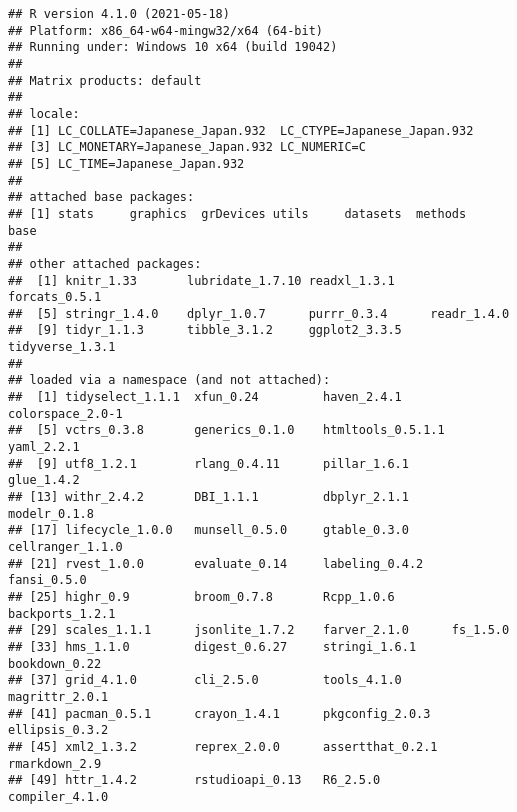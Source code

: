\documentclass[
]{book}
\begin{document}
\begin{verbatim}
## R version 4.1.0 (2021-05-18)
## Platform: x86_64-w64-mingw32/x64 (64-bit)
## Running under: Windows 10 x64 (build 19042)
## 
## Matrix products: default
## 
## locale:
## [1] LC_COLLATE=Japanese_Japan.932  LC_CTYPE=Japanese_Japan.932   
## [3] LC_MONETARY=Japanese_Japan.932 LC_NUMERIC=C                  
## [5] LC_TIME=Japanese_Japan.932    
## 
## attached base packages:
## [1] stats     graphics  grDevices utils     datasets  methods   base     
## 
## other attached packages:
##  [1] knitr_1.33       lubridate_1.7.10 readxl_1.3.1     forcats_0.5.1   
##  [5] stringr_1.4.0    dplyr_1.0.7      purrr_0.3.4      readr_1.4.0     
##  [9] tidyr_1.1.3      tibble_3.1.2     ggplot2_3.3.5    tidyverse_1.3.1 
## 
## loaded via a namespace (and not attached):
##  [1] tidyselect_1.1.1  xfun_0.24         haven_2.4.1       colorspace_2.0-1 
##  [5] vctrs_0.3.8       generics_0.1.0    htmltools_0.5.1.1 yaml_2.2.1       
##  [9] utf8_1.2.1        rlang_0.4.11      pillar_1.6.1      glue_1.4.2       
## [13] withr_2.4.2       DBI_1.1.1         dbplyr_2.1.1      modelr_0.1.8     
## [17] lifecycle_1.0.0   munsell_0.5.0     gtable_0.3.0      cellranger_1.1.0 
## [21] rvest_1.0.0       evaluate_0.14     labeling_0.4.2    fansi_0.5.0      
## [25] highr_0.9         broom_0.7.8       Rcpp_1.0.6        backports_1.2.1  
## [29] scales_1.1.1      jsonlite_1.7.2    farver_2.1.0      fs_1.5.0         
## [33] hms_1.1.0         digest_0.6.27     stringi_1.6.1     bookdown_0.22    
## [37] grid_4.1.0        cli_2.5.0         tools_4.1.0       magrittr_2.0.1   
## [41] pacman_0.5.1      crayon_1.4.1      pkgconfig_2.0.3   ellipsis_0.3.2   
## [45] xml2_1.3.2        reprex_2.0.0      assertthat_0.2.1  rmarkdown_2.9    
## [49] httr_1.4.2        rstudioapi_0.13   R6_2.5.0          compiler_4.1.0
\end{verbatim}

  
\end{document}
